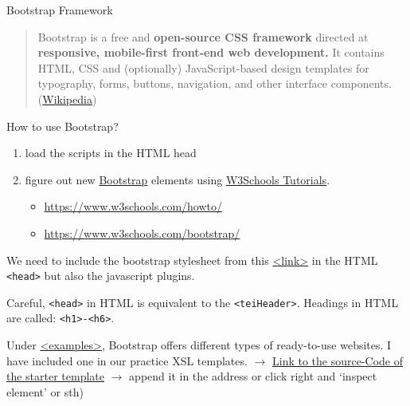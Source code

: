 \begin{frame}{Bootstrap Framework}
\footnotesize 
\begin{block}{}
\begin{quote}
    Bootstrap is a free and \textbf{open-source CSS framework} directed at \textbf{responsive, mobile-first front-end web development.} It contains HTML, CSS and (optionally) JavaScript-based design templates for typography, forms, buttons, navigation, and other interface components. (\href{https://en.wikipedia.org/wiki/Bootstrap_(front-end_framework)}{Wikipedia})
\end{quote}
\end{block}

\begin{block}{How to use Bootstrap?}
\begin{enumerate}
    \item load the scripts in the HTML head
    \item figure out new \href{https://getbootstrap.com/}{Bootstrap} elements using \href{https://www.w3schools.com/bootstrap/}{W3Schools Tutorials}.
    \begin{itemize}\scriptsize
        \item \protect\url{https://www.w3schools.com/howto/}
        \item \protect\url{https://www.w3schools.com/bootstrap/}
    \end{itemize}
\end{enumerate}
\end{block}

\framebreak 

We need to include the bootstrap stylesheet from this  \href{https://getbootstrap.com/docs/4.0/getting-started/introduction/}{<link>} in the HTML  \texttt{<head>} but also the javascript plugins. 

\begin{block}{}
Careful, \texttt{<head>} in HTML is equivalent to the \texttt{<teiHeader>}. Headings in HTML are called: \texttt{<h1>-<h6>}.
\end{block}
Under \href{https://getbootstrap.com/docs/4.0/examples/}{<examples>}, Bootstrap offers different types of ready-to-use websites. I have included one in our practice XSL templates. {\scriptsize  $\to$ \href{view-source:https://getbootstrap.com/docs/4.0/examples/starter-template/}{Link to the source-Code of the starter template} $\to$ append it in the address or click right and `inspect element' or sth)}


\end{frame}
